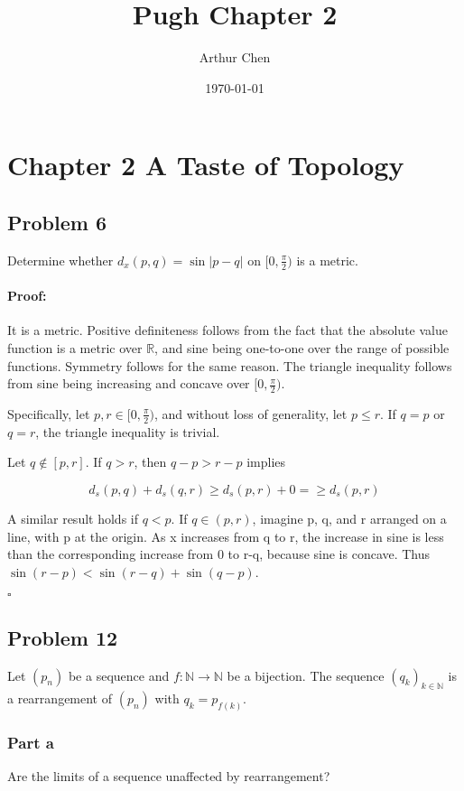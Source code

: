 \documentclass{article}
\author{Arthur Chen}
\title{Pugh Chapter 2}
\date{\today}
\newenvironment{proof}{\paragraph{Proof:}}{\hfill$\square$}
\begin{document}
\section*{Chapter 2 A Taste of Topology}

\subsection*{Problem 6}

Determine whether $d_x(p, q) = \sin |p - q|$ on $[0, \frac{\pi}{2})$ is a metric.

\begin{proof}

It is a metric. Positive definiteness follows from the fact that the absolute value function is a metric over $\mathbb{R}$, and sine being one-to-one over the range of possible functions. Symmetry follows for the same reason. The triangle inequality follows from sine being increasing and concave over $[0, \frac{\pi}{2})$.

Specifically, let $p, r \in [0, \frac{\pi}{2})$, and without loss of generality, let $p \leq r$. If $q = p$ or $q = r$, the triangle inequality is trivial. 

Let $q \notin [p, r]$. If $q > r$, then $q-p > r-p$ implies

\[
d_s(p, q) + d_s(q, r) \geq d_s(p, r) + 0 = \geq d_s(p, r)
\]

A similar result holds if $q < p$. If $q \in (p, r)$, imagine p, q, and r arranged on a line, with p at the origin. As x increases from q to r, the increase in sine is less than the corresponding increase from 0 to r-q, because sine is concave. Thus $\sin(r-p) < \sin(r-q) + \sin(q-p)$.

\end{proof}

\subsection*{Problem 12}

Let $(p_n)$ be a sequence and $f: \mathbb{N} \rightarrow \mathbb{N}$ be a bijection. The sequence $(q_k)_{k\in\mathbb{N}}$ is a rearrangement of $(p_n)$ with $q_k = p_{f(k)}$.

\subsubsection*{Part a}

Are the limits of a sequence unaffected by rearrangement?
\end{document}
